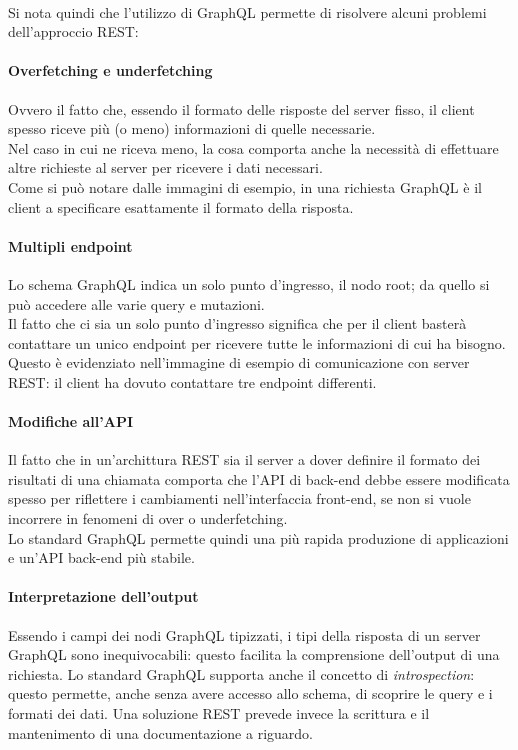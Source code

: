 \documentclass[a4paper, 12pt]{report}
\begin{document}
      \paragraph*{}Si nota quindi che l'utilizzo di GraphQL permette di risolvere alcuni problemi dell'approccio REST:
      \paragraph*{Overfetching e underfetching} 
        Ovvero il fatto che, essendo il formato delle risposte del server fisso, il client spesso riceve più (o meno) informazioni di quelle necessarie.\\
        Nel caso in cui ne riceva meno, la cosa comporta anche la necessità di effettuare altre richieste al server per ricevere i dati necessari.\\
        Come si può notare dalle immagini di esempio, in una richiesta GraphQL è il client a specificare esattamente il formato della risposta.
      \paragraph*{Multipli endpoint}
        Lo schema GraphQL indica un solo punto d'ingresso, il nodo root; da quello si può accedere alle varie query e mutazioni.\\
        Il fatto che ci sia un solo punto d'ingresso significa che per il client basterà contattare un unico endpoint per ricevere tutte le informazioni di cui ha bisogno.\\
        Questo è evidenziato nell'immagine di esempio di comunicazione con server REST: il client ha dovuto contattare tre endpoint differenti.
      \paragraph*{Modifiche all'API}
        Il fatto che in un'archittura REST sia il server a dover definire il formato dei risultati di una chiamata comporta che l'API di back-end debbe essere modificata spesso per riflettere i cambiamenti nell'interfaccia front-end, se non si vuole
        incorrere in fenomeni di over o underfetching.\\
        Lo standard GraphQL permette quindi una più rapida produzione di applicazioni e un'API back-end più stabile.
      \paragraph*{Interpretazione dell'output}
        Essendo i campi dei nodi GraphQL tipizzati, i tipi della risposta di un server GraphQL sono inequivocabili: questo facilita la comprensione dell'output di una richiesta.
        Lo standard GraphQL supporta anche il concetto di \emph{introspection}: questo permette, anche senza avere accesso allo schema, di scoprire le query e i formati dei dati.
        Una soluzione REST prevede invece la scrittura e il mantenimento di una documentazione a riguardo.
\end{document}
